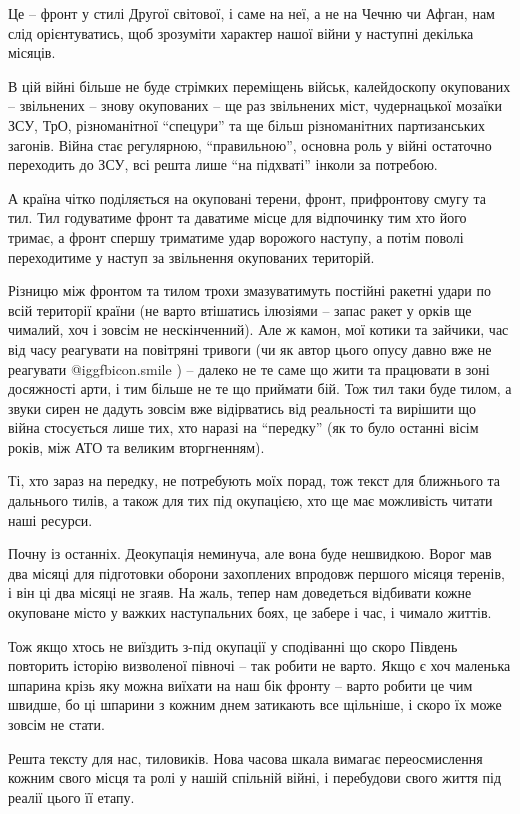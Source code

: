 Це – фронт у стилі Другої світової, і саме на неї, а не на Чечню чи Афган, нам
слід орієнтуватись, щоб зрозуміти характер нашої війни у наступні декілька
місяців.

В цій війні більше не буде стрімких переміщень військ, калейдоскопу окупованих
– звільнених – знову окупованих – ще раз звільнених міст, чудернацької мозаїки
ЗСУ, ТрО, різноманітної \enquote{спецури} та ще більш різноманітних партизанських
загонів. Війна стає регулярною, \enquote{правильною}, основна роль у війні остаточно
переходить до ЗСУ, всі решта лише \enquote{на підхваті} інколи за потребою.

А країна чітко поділяється на окуповані терени, фронт, прифронтову смугу та
тил. Тил годуватиме фронт та даватиме місце для відпочинку тим хто його тримає,
а фронт спершу триматиме удар ворожого наступу, а потім поволі переходитиме у
наступ за звільнення окупованих територій.

Різницю між фронтом та тилом трохи змазуватимуть постійні ракетні удари по всій
території країни (не варто втішатись ілюзіями – запас ракет у орків ще чималий,
хоч і зовсім не нескінченний). Але ж камон, мої котики та зайчики, час від часу
реагувати на повітряні тривоги (чи як автор цього опусу давно вже не реагувати
 @igg{fbicon.smile}  ) – далеко не те саме що жити та працювати в зоні досяжності арти, і тим
більше не те що приймати бій. Тож тил таки буде тилом, а звуки сирен не дадуть
зовсім вже відірватись від реальності та вирішити що війна стосується лише тих,
хто наразі на \enquote{передку} (як то було останні вісім років, між АТО та великим
вторгненням).

Ті, хто зараз на передку, не потребують моїх порад, тож текст для ближнього та
дальнього тилів, а також для тих під окупацією, хто ще має можливість читати
наші ресурси.

Почну із останніх. Деокупація неминуча, але вона буде нешвидкою. Ворог мав два
місяці для підготовки оборони захоплених впродовж першого місяця теренів, і він
ці два місяці не згаяв. На жаль, тепер нам доведеться відбивати кожне окуповане
місто у важких наступальних боях, це забере і час, і чимало життів. 

Тож якщо хтось не виїздить з-під окупації у сподіванні що скоро Південь
повторить історію визволеної півночі – так робити не варто. Якщо є хоч маленька
шпарина крізь яку можна виїхати на наш бік фронту – варто робити це чим швидше,
бо ці шпарини з кожним днем затикають все щільніше, і скоро їх може зовсім не
стати.

Решта тексту для нас, тиловиків. Нова часова шкала вимагає переосмислення
кожним свого місця та ролі у нашій спільній війні, і перебудови свого життя під
реалії цього її етапу.

